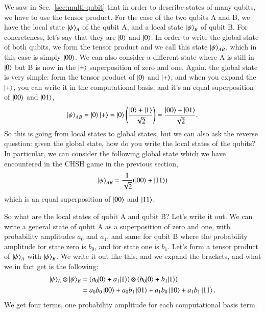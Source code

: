 We saw in Sec.~\ref{sec:multi-qubit} that in order to describe states of many qubits, we have to use the tensor product. For the case of the two qubits A and B, we have the local state $\left| \psi \right\rangle_A$ of the qubit A, and a local state $\left| \psi \right\rangle_B$ of qubit B. For concreteness, let's say that they are $\left| 0 \right\rangle$ and $\left| 0 \right\rangle$. In order to write the global state of both qubits, we form the tensor product and we call this state $\left| \psi \right\rangle_{AB}$, which in this case is simply $\left| 00 \right\rangle$. We can also consider a different state where A is still in $\left| 0 \right\rangle$ but B is now in the $\left| + \right\rangle$ superposition of zero and one. Again, the global state is very simple: form the tensor product of $\left| 0 \right\rangle$ and $\left| + \right\rangle$, and when you expand the $\left| + \right\rangle$, you can write it in the computational basis, and it's an equal superposition of $\left| 00 \right\rangle$ and $\left| 01 \right\rangle$,
\begin{equation}
\left| \psi \right\rangle_{AB} = \left| 0 \right\rangle\left| + \right\rangle = \left| 0 \right\rangle\left(\frac{\left| 0 \right\rangle + \left| 1 \right\rangle}{\sqrt{2}}\right) = \frac{\left| 00 \right\rangle + \left| 01 \right\rangle}{\sqrt2}.
\end{equation}
So this is going from local states to global states, but we can also ask the reverse question: given the global state, how do you write the local states of the qubits? In particular, we can consider the following global state which we have encountered in the CHSH game in the previous section,
\begin{equation}
\left| \psi \right\rangle_{AB} = \frac{1}{\sqrt2}(\left| 00 \right\rangle + \left| 11 \right\rangle)
\end{equation}
which is an equal superposition of $\left| 00 \right\rangle$ and $\left| 11 \right\rangle$.

So what are the local states of qubit A and qubit B? Let's write it out. We can write a general state of qubit A as a superposition of zero and one, with probability amplitudes $a_0$ and $a_1$, and same for qubit B where the probability amplitude for state zero is $b_0$, and for state one is $b_1$. 
Let's form a tensor product of $\left| \psi \right\rangle_A$ with $\left| \psi \right\rangle_B$. We write it out like this, and we expand the brackets, and what we in fact get is the following: 
\begin{equation}
\begin{aligned}
|\psi\rangle_{A} \otimes|\psi\rangle_{B} &= \left(a_{0}|0\rangle+a_{1}|1\rangle\right) \otimes\left(b_{0}|0\rangle+b_{1}|1\rangle\right) \\
 &= a_0 b_0\left| 00 \right\rangle + a_0 b_1\left| 01 \right\rangle + a_1 b_0\left| 10 \right\rangle + a_1 b_1\left| 11 \right\rangle.
\end{aligned}
\end{equation}
We get four terms, one probability amplitude for each computational basis term.

